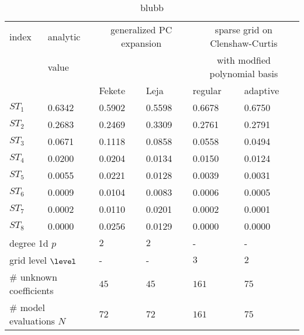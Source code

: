 
\begin{table}[!ht]
  \fontsize{8pt}{3ex}\selectfont
  \renewcommand{\arraystretch}{1.2}
  \begin{tabularx}{\textwidth}{XXXXXX}
    \toprule
    index &
    analytic &
    \multicolumn{2}{c}{generalized PC expansion} &
    \multicolumn{2}{c}{sparse grid on Clenshaw-Curtis} \\
    & value & & &
    \multicolumn{2}{c}{with modfied polynomial basis} \\
    \hline
    & &
    \multicolumn{1}{l}{Fekete} &
    \multicolumn{1}{l}{Leja} &
    \multicolumn{1}{l}{regular} &
    \multicolumn{1}{l}{adaptive} \\
    \toprule
    $ST_1$ & 0.6342 & 0.5902 & 0.5598 & 0.6678 & 0.6750 \\
    $ST_2$ & 0.2683 & 0.2469 & 0.3309 & 0.2761 & 0.2791 \\
    $ST_3$ & 0.0671 & 0.1118 & 0.0858 & 0.0558 & 0.0494 \\
    $ST_4$ & 0.0200 & 0.0204 & 0.0134 & 0.0150 & 0.0124 \\
    $ST_5$ & 0.0055 & 0.0221 & 0.0128 & 0.0039 & 0.0031 \\
    $ST_6$ & 0.0009 & 0.0104 & 0.0083 & 0.0006 & 0.0005 \\
    $ST_7$ & 0.0002 & 0.0110 & 0.0201 & 0.0002 & 0.0001 \\
    $ST_8$ & 0.0000 & 0.0256 & 0.0129 & 0.0000 & 0.0000 \\
    \hline
        \multicolumn{2}{l}{degree 1d $p$} &
    \multicolumn{1}{l}{$2$} &
    \multicolumn{1}{l}{$2$} &
    \multicolumn{1}{l}{-} &
    \multicolumn{1}{l}{-} \\
    \multicolumn{2}{l}{grid level $\level$} &
    \multicolumn{1}{l}{-} &
    \multicolumn{1}{l}{-} &
    \multicolumn{1}{l}{$3$} &
    \multicolumn{1}{l}{$2$} \\
    \multicolumn{2}{l}{\# unknown coefficients} &
    \multicolumn{1}{l}{$45$} &
    \multicolumn{1}{l}{$45$} &
    \multicolumn{1}{l}{$161$} &
    \multicolumn{1}{l}{$75$} \\
    \multicolumn{2}{l}{\# model evaluations $N$} &
    \multicolumn{1}{l}{$72$} &
    \multicolumn{1}{l}{$72$} &
    \multicolumn{1}{l}{$161$} &
    \multicolumn{1}{l}{$75$} \\
    \bottomrule
  \end{tabularx}
  \caption{blubb}
  \label{tab::sobolgfunction-full-model-anova}
\end{table}
